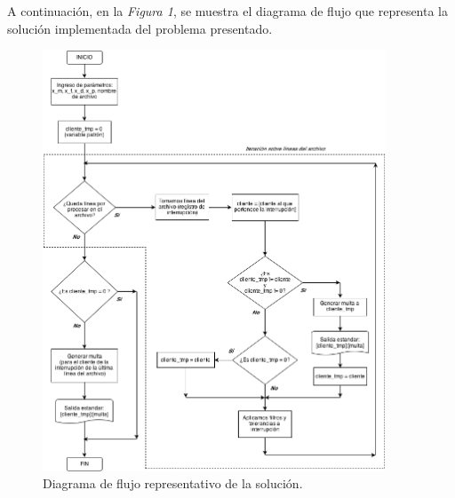 \documentclass{article}
\begin{document}
	A continuación, en la \textit{Figura 1}, se muestra el diagrama de flujo que representa la solución implementada del problema presentado. 

\newpage
\begin{figure}[h]
	\centering
	\includegraphics[width=0.91\textwidth]{images/diagrama01.png}
	\medskip
	\caption{Diagrama de flujo representativo de la solución.}
\end{figure}
\bigskip\bigskip
	
\end{document}
